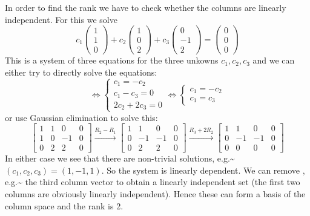 \documentclass[
  a4paper,
  DIV=11,
  numbers=noendperiod,
  oneside]{scrreprt}
\theoremstyle{definition}
\theoremstyle{remark}
\newenvironment{fbx}[3]{\begin{tcolorbox}[enhanced, breakable,%
attach boxed title to top*={xshift=1.4pt},
boxed title style={boxrule=0.0mm, fuzzy shadow={1pt}{-1pt}{0mm}{0.1mm}{gray}, arc=.3em, rounded corners=east, sharp corners=west}, colframe=#1-color2, colbacktitle=#1-color1, colback = white, coltitle=black,  titlerule=0mm, toprule=0pt, bottomrule=.7pt, leftrule=.3em, rightrule=0pt, outer arc=.3em,  arc=0pt,	 sharp corners = east, left=.5em, bottomtitle=1mm, toptitle=1mm,title=\textbf{#2}\hspace{0.5em}{#3}]}
{\end{tcolorbox}}
\begin{document}
\label{Solutionux2a-3.9}
\begin{fbx}{Solution}{Solution}{}
\label{Solution*-3.9}
In order to find the rank we have to check whether the columns are
linearly independent. For this we solve
\[c_1 \begin{pmatrix} 1 \\ 1 \\ 0  \end{pmatrix}+ c_2 \begin{pmatrix} 1 \\ 0 \\ 2  \end{pmatrix} + c_3 \begin{pmatrix} 0 \\ -1 \\ 2  \end{pmatrix} = \begin{pmatrix} 0 \\ 0 \\ 0  \end{pmatrix} \]
This is a system of three equations for the three unkowns
\(c_1,c_2,c_3\) and we can either try to directly solve the equations:
\[ \Leftrightarrow \left\{\begin{array}{l}
 c_1  = - c_2 \\
 c_1 - c_3=0 \\
 2 c_2 + 2 c_3 =0
        \end{array}  \right.    \Leftrightarrow  \left\{ \begin{array}{l}
 c_1 = - c_2  \\
 c_1 = c_3 
        \end{array}  \right. \] or use Gaussian elimination to solve
this:
\[\left[\begin{array}{ccc|c} 1 & 1 & 0 & 0\\ 1 & 0 & -1 & 0 \\ 0 & 2 & 2 & 0\end{array}\right] \xrightarrow{R_2 - R_1} \left[\begin{array}{ccc|c} 1 & 1 & 0 & 0\\ 0 & -1 & -1 & 0\\ 0 & 2 & 2 & 0 \end{array}\right] \xrightarrow{R_3 + 2R_2} \left[\begin{array}{ccc|c} 1 & 1 & 0 & 0 \\ 0 & -1 & -1 & 0\\ 0 & 0 & 0 & 0 \end{array}\right]\]
In either case we see that there are non-trivial solutions,
e.g.\textasciitilde{}\((c_1,c_2,c_3)=(1,-1,1)\). So the system is
linearly dependent. We can remove , e.g.\textasciitilde{} the third
column vector to obtain a linearly independent set (the first two
columns are obviously linearly independent). Hence these can form a
basis of the column space and the rank is 2.


\end{fbx}
\end{document}

